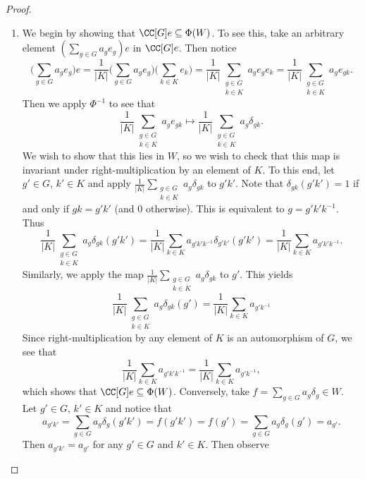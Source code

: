 \begin{proof}
	\begin{enumerate}[\itshape(i)]
		\item We begin by showing that $\CC[G]e\subseteq \Phi(W)$.
		      To see this, take an arbitrary element $(\sum_{g\in G} a_ge_g)e$ in $\CC[G]e$.
		      Then notice
		      \[
			      \bigg(\sum_{g\in G} a_ge_g\bigg)e = \frac{1}{|K|}\bigg(\sum_{g\in G} a_ge_g\bigg)\bigg(\sum_{k\in K}e_k\bigg) = \frac{1}{|K|}\sum_{\substack{g\in G \\ k\in K}} a_ge_ge_k = \frac{1}{|K|}\sum_{\substack{g\in G \\ k\in K}} a_ge_{gk}.
		      \]
		      Then we apply $\Phi^{-1}$ to see that
		      \[
			      \frac{1}{|K|}\sum_{\substack{g\in G \\ k\in K}} a_ge_{gk} \mapsto \frac{1}{|K|}\sum_{\substack{g\in G \\ k\in K}} a_g\delta_{gk}.
		      \]
		      We wish to show that this lies in $W$, so we wish to check that this map is invariant under right-multiplication by an element of $K$.
		      To this end, let $g'\in G$, $k'\in K$ and apply $\frac{1}{|K|}\sum_{\substack{g\in G \\ k\in K}} a_g\delta_{gk}$ to $g'k'$.
		      Note that $\delta_{gk}(g'k')=1$ if and only if $gk=g'k'$ (and $0$ otherwise).
		      This is equivalent to $g=g'k'k^{-1}$.
		      Thus
		      \[
			      \frac{1}{|K|}\sum_{\substack{g\in G \\ k\in K}} a_g\delta_{gk}(g'k') = \frac{1}{|K|}\sum_{k\in K} a_{g'k'k^{-1}}\delta_{g'k'}(g'k') = \frac{1}{|K|}\sum_{k\in K} a_{g'k'k^{-1}}.
		      \]
		      Similarly, we apply the map $\frac{1}{|K|}\sum_{\substack{g\in G \\ k\in K}} a_g\delta_{gk}$ to $g'$.
		      This yields
		      \[
			      \frac{1}{|K|}\sum_{\substack{g\in G \\ k\in K}} a_g\delta_{gk}(g') = \frac{1}{|K|}\sum_{k\in K} a_{g'k^{-1}}
		      \]
		      Since right-multiplication by any element of $K$ is an automorphism of $G$, we see that
		      \[
			      \frac{1}{|K|}\sum_{k\in K} a_{g'k'k^{-1}}=\frac{1}{|K|}\sum_{k\in K} a_{g'k^{-1}},
		      \]
		      which shows that $\CC[G]e\subseteq \Phi(W)$.
		      Conversely, take $f=\sum_{g\in G} a_g\delta_g\in W$.
		      Let $g'\in G$, $k'\in K$ and notice that
		      \[
			      a_{g'k'} = \sum_{g\in G} a_g\delta_g(g'k') = f(g'k') = f(g') = \sum_{g\in G} a_g \delta_g(g') = a_{g'}.
		      \]
		      Then $a_{g'k'}=a_{g'}$ for any $g'\in G$ and $k'\in K$.
		      Then observe

\end{enumerate}
\end{proof}
